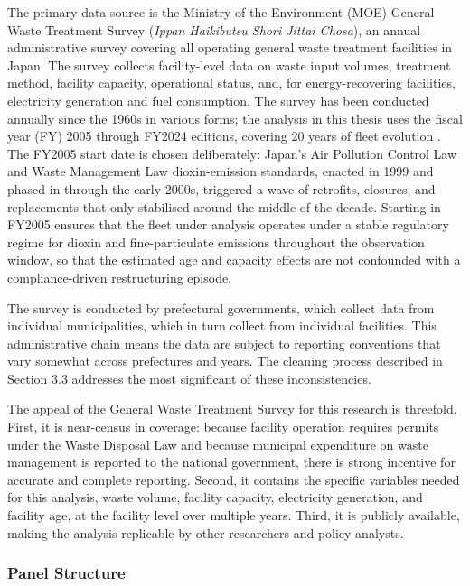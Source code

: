 \documentclass[12pt,a4paper]{article}
\begin{document}
The primary data source is the Ministry of the Environment (MOE) General Waste Treatment Survey (\emph{Ippan Haikibutsu Shori Jittai Chosa}), an annual administrative survey covering all operating general waste treatment facilities in Japan. The survey collects facility-level data on waste input volumes, treatment method, facility capacity, operational status, and, for energy-recovering facilities, electricity generation and fuel consumption. The survey has been conducted annually since the 1960s in various forms; the analysis in this thesis uses the fiscal year (FY) 2005 through FY2024 editions, covering 20 years of fleet evolution \citep{MOEJ2022}. The FY2005 start date is chosen deliberately: Japan's Air Pollution Control Law and Waste Management Law dioxin-emission standards, enacted in 1999 and phased in through the early 2000s, triggered a wave of retrofits, closures, and replacements that only stabilised around the middle of the decade. Starting in FY2005 ensures that the fleet under analysis operates under a stable regulatory regime for dioxin and fine-particulate emissions throughout the observation window, so that the estimated age and capacity effects are not confounded with a compliance-driven restructuring episode.

The survey is conducted by prefectural governments, which collect data from individual municipalities, which in turn collect from individual facilities. This administrative chain means the data are subject to reporting conventions that vary somewhat across prefectures and years. The cleaning process described in Section 3.3 addresses the most significant of these inconsistencies.

The appeal of the General Waste Treatment Survey for this research is threefold. First, it is near-census in coverage: because facility operation requires permits under the Waste Disposal Law and because municipal expenditure on waste management is reported to the national government, there is strong incentive for accurate and complete reporting. Second, it contains the specific variables needed for this analysis, waste volume, facility capacity, electricity generation, and facility age, at the facility level over multiple years. Third, it is publicly available, making the analysis replicable by other researchers and policy analysts.

\subsubsection{Panel Structure}
\end{document}
